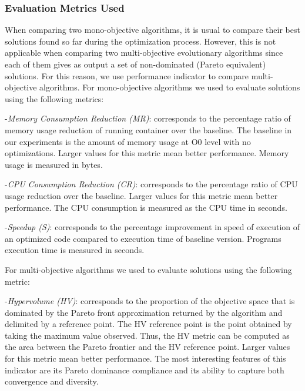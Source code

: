 \subsubsection{Evaluation Metrics Used}
When comparing two mono-objective algorithms, it is usual to
compare their best solutions found so far during the optimization
process. However, this is not applicable when comparing two multi-objective
evolutionary algorithms since each of them gives as output
a set of non-dominated (Pareto equivalent) solutions. For this reason,
we use performance indicator to compare multi-objective algorithms.
For mono-objective algorithms we used to evaluate solutions using the following metrics:

-\textit{Memory Consumption Reduction (MR)}: corresponds to the percentage ratio of memory usage reduction of running container over the baseline. The baseline in our experiments is the amount of memory usage at O0 level with no optimizations. Larger values for this metric mean better performance. Memory usage is measured in bytes.

-\textit{CPU Consumption Reduction (CR)}: corresponds to the percentage ratio of CPU usage reduction over the baseline. Larger values for this metric mean better performance. The CPU consumption is measured as the CPU time in seconds.

-\textit{Speedup (S)}: corresponds to the percentage improvement in speed of execution of an optimized code compared to execution time of baseline version. Programs execution time is measured in seconds.

For multi-objective algorithms we used to evaluate solutions using the following metric:

-\textit{Hypervolume (HV)}: corresponds to the proportion of the objective space that is dominated by the Pareto front approximation returned by the algorithm and delimited by a reference point. The HV reference point is the point obtained by taking the maximum value observed. Thus, the HV metric can be computed as the area between the Pareto frontier and the HV reference point. Larger values for this metric mean better performance. The most interesting features of this indicator are its Pareto dominance compliance and its ability to capture both convergence and diversity\cite{deb2001multi}. 

